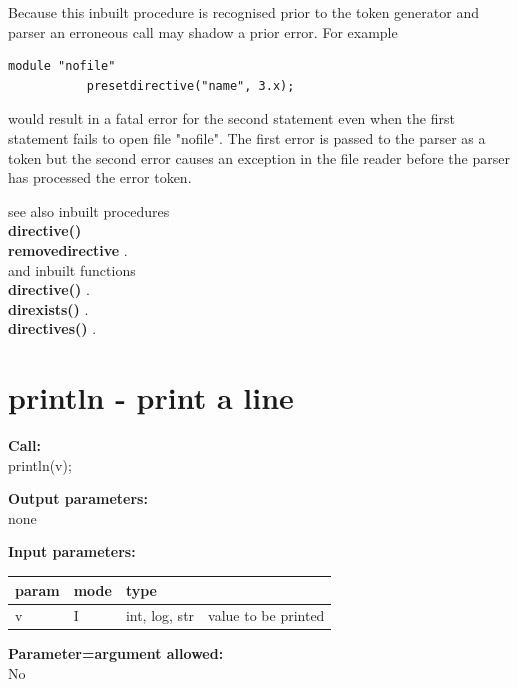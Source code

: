         Because this inbuilt procedure is recognised prior to the token
        generator and parser an erroneous call may shadow a prior error. For
        example
        \begin{lstlisting}[gobble=8, language=threepl]
           module "nofile"
           presetdirective("name", 3.x);
        \end{lstlisting}
        would result in a fatal error for the second statement even when the
        first statement fails to open file "nofile". The first error is passed
        to the parser as a token but the second error causes an exception
        in the file reader before the parser has processed the error token.
        
        see also inbuilt procedures \\
        {\bf directive()}  \\
        {\bf removedirective} . \\
        and inbuilt functions \\
        {\bf directive()} .\\
        {\bf direxists()} .\\
        {\bf directives()} . \\


    \section{println - print a line}\label{sec:ipprintln}
        
        {\bf Call:} \\
        println(v);
        
        {\bf Output parameters:} \\
        none
        
        {\bf Input parameters:} \\
        \begin{tabular}{| l | l | l | l |}
        \hline
        param & mode & type & \\
        \hline \hline
        v & I & int, log, str & value to be printed \\ \hline
        \end{tabular}
        
        {\bf Parameter=argument allowed:} \\
        No
        
